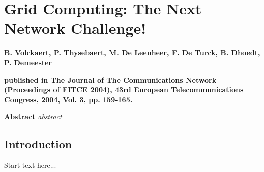 \graphicspath{{chapt_dutch/}{intro/}{chapt2/}{chapt3/}{chapt4/}{chapt5/}}

\renewcommand\evenpagerightmark{{\scshape\small Appendix A}}
\renewcommand\oddpageleftmark{{\scshape\small Grid Computing: The Next Network Challenge!}}

\renewcommand{\bibname}{References}

\hyphenation{}

\chapter[Grid Computing: The Next Network Challenge!]%
{Grid Computing: The Next Network Challenge!}
\label{app1}

\par{\large{\textbf{B. Volckaert, P. Thysebaert, M. De Leenheer, F. De Turck, B. Dhoedt, P. Demeester}}}
\vspace{0.2in}
\par{\noindent\textbf{published in The Journal of The Communications Network (Proceedings of FITCE 2004), 43rd European Telecommunications Congress, 2004, Vol. 3, pp. 159-165.}}
\vspace{0.1in}

\par{\bf{Abstract}}
\emph{
abstract
}

\section{Introduction}
Start text here...




\clearpage{\pagestyle{empty}\cleardoublepage}
